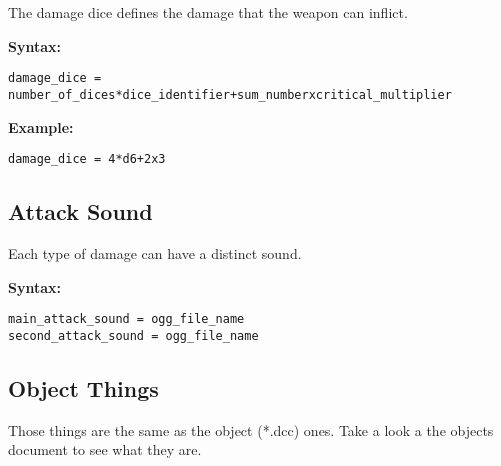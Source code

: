 \documentclass[letterpaper,12pt]{article}
\begin{document}
The damage dice defines the damage that the weapon can inflict.

{\bf Syntax:}
\begin{verbatim}
damage_dice = number_of_dices*dice_identifier+sum_numberxcritical_multiplier
\end{verbatim}

{\bf Example:}
\begin{verbatim}
damage_dice = 4*d6+2x3
\end{verbatim}

\subsection{Attack Sound}

Each type of damage can have a distinct sound.

{\bf Syntax:}
\begin{verbatim}
main_attack_sound = ogg_file_name
second_attack_sound = ogg_file_name
\end{verbatim}

\subsection{Object Things}
Those things are the same as the object (*.dcc) ones. Take a look a the objects document to see what they are.
\end{document}
